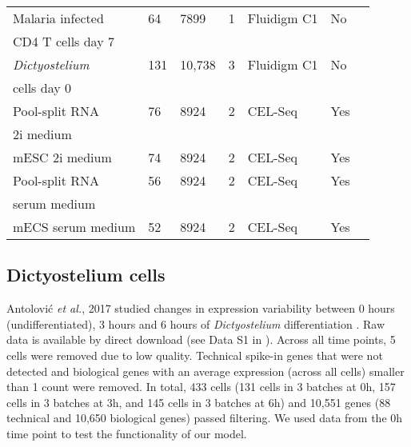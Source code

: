 \begin{table}[ht	]
\begin{tabular}{lllllll}
Malaria infected  & 64       & 7899     & 1          & Fluidigm C1       & No   & \citep{Lonnberg2017}         \\
CD4\plus{}  T cells day 7    &   & &  &  &  &   \\
\midrule

\textit{Dictyostelium}             & 131      & 10,738    & 3          & Fluidigm C1       & No   & \citep{Antolovic2017}        \\
cells day 0  &  &   &   &  & & \\
\midrule

Pool-split RNA                 & 76       & 8924     & 2          & CEL-Seq           & Yes  & \citep{Grun2014}            \\
2i medium  &  &  & &  &  & \\
\midrule

mESC 2i medium    & 74       & 8924     & 2          & CEL-Seq           & Yes  & \citep{Grun2014} \\
\midrule

Pool-split RNA             & 56       & 8924     & 2          & CEL-Seq           & Yes  & \citep{Grun2014}            \\
serum medium &  &      &         &   &   &  \\
\midrule

mECS serum medium & 52       & 8924     & 2          & CEL-Seq           & Yes  & \citep{Grun2014} \\
\bottomrule       
\end{tabular}
\end{table}

\subsection{Dictyostelium cells} \label{seq::data_dict}

Antolovi\'{c} \emph{et al.}, 2017 studied changes in expression variability between 0 hours (undifferentiated), 3 hours and 6 hours of \emph{Dictyostelium} differentiation \cite{Antolovic2017}. Raw data is available by direct download (see Data S1 in \citep{Antolovic2017}). Across all time points, 5 cells were removed due to low quality. Technical spike-in genes that were not detected and biological genes with an average expression (across all cells) smaller than 1 count were removed. In total, 433 cells (131 cells in 3 batches at 0h, 157 cells in 3 batches at 3h, and 145 cells in 3 batches at 6h) and 10,551 genes (88 technical and 10,650 biological genes) passed filtering. We used data from the 0h time point to test the functionality of our model.

